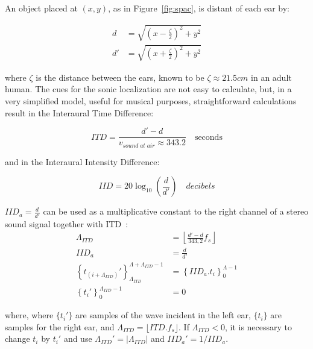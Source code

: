 An object placed at $(x,y)$, as in Figure~\ref{fig:spac}, is distant of each ear by:

\begin{equation}\label{eq:distOuvidos}
\begin{split}
d & =\sqrt{\left (x-\frac{\zeta}{2} \right )^2+y^2} \\
d' & =\sqrt{\left (x+\frac{\zeta}{2} \right )^2 + y^2}
\end{split}
\end{equation}

\noindent where $\zeta$ is the distance between the ears, known to be $\zeta \approx 21.5cm$ in an adult human.
The cues for the sonic localization are not easy to calculate, but,
in a very simplified model, useful for musical purposes,
straightforward calculations result in the Interaural Time Difference:

\begin{equation}\label{eq:dti}
ITD=\frac{d'-d}{v_{sound\;at\;air}\approx 343.2 }\quad \text{seconds}
\end{equation}

\noindent and in the Interaural Intensity Difference:

\begin{equation}\label{eq:dii}
IID=20\log_{10}\left (\frac{d}{d'}\right) \quad decibels
\end{equation}

$IID_a=\frac{d}{d'}$ can be used as a multiplicative constant to the right channel of a stereo sound signal
together with ITD~\cite{Heeger}:
\begin{equation}\label{eq:locImpl}
\begin{split}
\Lambda_{ITD} & = \left \lfloor \frac{d'-d}{343,2}  f_s \right \rfloor \\
IID_a & = \frac{d}{d'} \\
\left\{t_{(i+\Lambda_{ITD})}'\right\}_{\Lambda_{ITD}}^{\Lambda+\Lambda_{ITD}-1} & =\left\{IID_a . t_i\right\}_0^{\Lambda-1} \\
\left\{t_i'\right\}_0^{\Lambda_{ITD}-1} & = 0
\end{split}
\end{equation}

\noindent where,
where $\{t_i'\}$ are samples of the wave incident in the left ear, $\{t_i\}$ are samples for the right ear,
and $\Lambda_{ITD}=\lfloor ITD . f_s \rfloor$.
If $\Lambda_{ITD} < 0$, it is necessary to change $t_i$ by $t_i'$
and use $\Lambda_{ITD}'= | \Lambda_{ITD} |$ and $IID_a'=1 / IID_a$.

